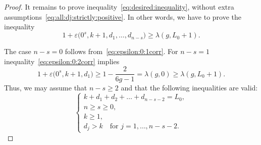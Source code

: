 \documentclass[11pt]{article}
\renewcommand{\epsilon}{\varepsilon}
\theoremstyle{definition}
\begin{document}
\begin{proof}
It remains to prove inequality~\eqref{eq:desired:inequality},
without extra assumptions~\eqref{eq:all:dj:strictly:positive}.
In other words, we have to prove the inequality
\[
1+\epsilon\big(0^s,k+1,d_1,\dots,d_{n-s}\big)\ge \lambda(g,L_0+1) .
\]

The case $n-s=0$ follows from~\eqref{eq:epsilon:0:1corr}. For $n-s=1$ inequality~\eqref{eq:epsilon:0:2corr} implies
\[
1+\epsilon\big(0^s,k+1,d_1\big)\ge 1-\frac{2}{6g-1} =\lambda(g,0) \ge \lambda(g,L_0+1) .
\]
Thus, we may assume that $n-s\ge 2$ and that the following inequalities are valid:
\[
\begin{cases}
k+d_1+d_2+\dots+d_{n-s-2}=L_0 ,
\\ n\ge s\ge 0 ,
\\ k\ge 1 ,
\\ d_j> k\quad\text{for }j=1,\dots,n-s-2 .
\end{cases}
\]


\end{proof}
\end{document}
